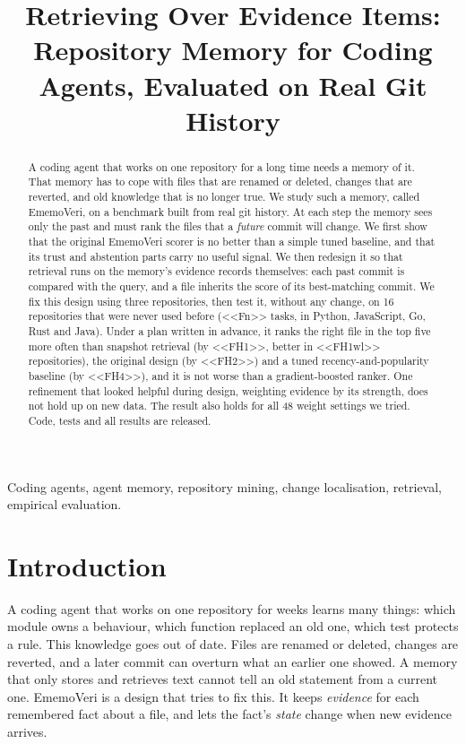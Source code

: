 \documentclass[conference]{IEEEtran}
\newcommand{\sys}{EmemoVeri}
\begin{document}
\title{Retrieving Over Evidence Items: Repository Memory for Coding Agents, Evaluated on Real Git History}
\author{
\and
{}
}
\maketitle
\begin{abstract}
A coding agent that works on one repository for a long time needs a memory of it. That memory has to cope with files that are renamed or deleted, changes that are reverted, and old knowledge that is no longer true. We study such a memory, called \sys{}, on a benchmark built from real git history. At each step the memory sees only the past and must rank the files that a \emph{future} commit will change. We first show that the original \sys{} scorer is no better than a simple tuned baseline, and that its trust and abstention parts carry no useful signal. We then redesign it so that retrieval runs on the memory's evidence records themselves: each past commit is compared with the query, and a file inherits the score of its best-matching commit. We fix this design using three repositories, then test it, without any change, on 16 repositories that were never used before (<<Fn>> tasks, in Python, JavaScript, Go, Rust and Java). Under a plan written in advance, it ranks the right file in the top five more often than snapshot retrieval (by <<FH1>>, better in <<FH1wl>> repositories), the original design (by <<FH2>>) and a tuned recency-and-popularity baseline (by <<FH4>>), and it is not worse than a gradient-boosted ranker. One refinement that looked helpful during design, weighting evidence by its strength, does not hold up on new data. The result also holds for all 48 weight settings we tried. Code, tests and all results are released.
\end{abstract}
\begin{IEEEkeywords}
Coding agents, agent memory, repository mining, change localisation, retrieval, empirical evaluation.
\end{IEEEkeywords}

\section{Introduction}
A coding agent that works on one repository for weeks learns many things: which module owns a behaviour, which function replaced an old one, which test protects a rule. This knowledge goes out of date. Files are renamed or deleted, changes are reverted, and a later commit can overturn what an earlier one showed. A memory that only stores and retrieves text cannot tell an old statement from a current one. \sys{} is a design that tries to fix this. It keeps \emph{evidence} for each remembered fact about a file, and lets the fact's \emph{state} change when new evidence arrives.
\end{document}
